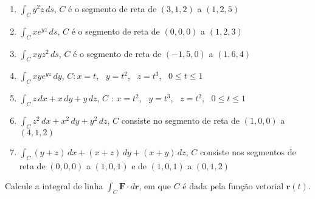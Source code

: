 \begin{enumerate}
		\item $\displaystyle \int_C y^{2}z \, ds$, \quad $C$ é o segmento de reta de $(3,1,2)$ a $(1,2,5)$

		\item $\displaystyle \int_C xe^{yz} \, ds$, \quad $C$ é o segmento de reta de $(0,0,0)$ a $(1,2,3)$

		\item $\displaystyle \int_C xyz^2 \, ds$, \quad $C$ é o segmento de reta de $(-1,5,0)$ a $(1,6,4)$
		\resposta{\fazer}

		\item $\displaystyle \int_C xye^{yz} \, dy$, \quad $C: x = t$, \, $y = t^2$, \, $z = t^3$, \, $0 \leq t \leq 1$

		\item $\displaystyle \int_C z \, dx + x \, dy + y \, dz$, \quad $C$ : $x = t^2$, \, $y = t^3$, \, $z = t^2$, \, $0 \leq t \leq 1$
		\resposta{\fazer}

		\item $\displaystyle \int_C z^2 \, dx + x^2 \, dy + y^2 \, dz$, \quad $C$ consiste no segmento de reta de $(1,0,0)$ a $(4,1,2)$

		\item $\displaystyle \int_C (y + z) \, dx + (x + z) \, dy + (x + y) \, dz$, \quad $C$ consiste nos segmentos de reta de $(0,0,0)$ a $(1,0,1)$ e de $(1,0,1)$ a $(0,1,2)$
	
	\end{enumerate}
	
	\vspace{5mm}
	
	Calcule a integral de linha $\displaystyle \int_C \textbf{F} \cdot d\textbf{r}$, em que $C$ é dada pela função vetorial $\textbf{r}(t)$.
	

